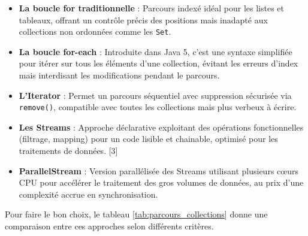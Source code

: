 \documentclass[12pt,a4paper]{report}
\begin{document}
	\begin{itemize}
		
		\item \textbf{La boucle for traditionnelle} : Parcours indexé idéal pour les listes et tableaux, offrant un contrôle précis des positions mais inadapté aux collections non ordonnées comme les \verb|Set|.
		
		\item \textbf{La boucle for-each} : Introduite dans Java 5, c'est une syntaxe simplifiée pour itérer sur tous les éléments d'une collection, évitant les erreurs d'index mais interdisant les modifications pendant le parcours.
		
		\item \textbf{L'Iterator} : Permet un parcours séquentiel avec suppression sécurisée via \verb|remove()|, compatible avec toutes les collections mais plus verbeux à écrire.
		
		\item \textbf{Les Streams} : Approche déclarative exploitant des opérations fonctionnelles (filtrage, mapping) pour un code lisible et chainable, optimisé pour les traitements de données. [3]
		
		\item \textbf{ParallelStream} : Version parallélisée des Streams utilisant plusieurs cœurs CPU pour accélérer le traitement des gros volumes de données, au prix d'une complexité accrue en synchronisation.
		
	\end{itemize}
	
	Pour faire le bon choix, le tableau \ref{tab:parcours_collections} donne une comparaison entre ces approches selon différents critères.
	
\end{document}
